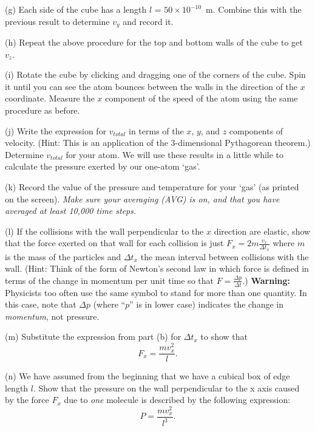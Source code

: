 (g) Each side of the cube has a length $l$ = $50 \times 10^{-10}$~m.
Combine this with the previous result to determine $v_y$ and record it.
\answerspace{15mm}

\pagebreak[2]
(h) Repeat the above procedure for the top and bottom walls of the cube to get $v_z$.
\answerspace{15mm}

(i) Rotate the cube by clicking and dragging one of the corners of the cube.
Spin it until you can see the atom bounces between the walls in the direction of
the $x$ coordinate.
Measure the $x$ component of the speed of the atom using the same procedure as before.
\answerspace{15mm}

(j) Write the
expression for $v_{total}$ in terms of the $x$, $y$, and $z$ components
of velocity. (Hint: This is an application of the 3-dimensional Pythagorean
theorem.) Determine $v_{total}$ for your atom.
We will use these results in a little while to calculate the pressure exerted by
our one-atom `gas'.
\answerspace{15mm}

(k) Record the value of the pressure and temperature for your `gas' (as printed on the screen).  \textit{Make sure your averaging (AVG) is on, and that you have averaged at least 10,000 time steps.}
\answerspace{15mm}

(l) If the collisions with the wall perpendicular to the $x$ direction
are elastic, show that the force exerted on that wall for each collision
is just $F_{x}=2m\frac{v_{x}}{\Delta t_{x}}$ where $m$ is the mass
of the particles and $\Delta t_{x}$ the mean interval between
collisions with the wall. (Hint: Think of the form of Newton's second
law in which force is defined in terms of the change in momentum per
unit time so that $F=\frac{\Delta p}{\Delta t}$.) \textbf{Warning:} Physicists too often use the same symbol to stand
for more than one quantity. In this case, note that $\Delta p$
(where ``$p$'' is in lower case) indicates the change in \emph{momentum},
not pressure.
\answerspace{15mm}

(m) Substitute the expression from part (b) for $\Delta t_{x}$
to show that 
\[
F_{x}=\frac{mv_{x}^{2}}{l}.\]

\answerspace{15mm}

(n) We have assumed from the beginning that we have a cubical box of edge length $l$. Show that the pressure on the wall perpendicular to the x axis caused by
the force $F_{x}$ due to \emph{one} molecule is described by
the following expression:
\[
P=\frac{mv_{x}^{2}}{l^{3}}.\]

\answerspace{5mm}

